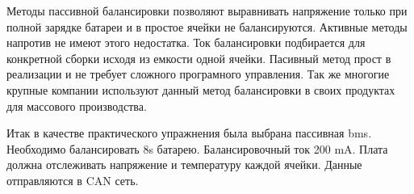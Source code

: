 Методы пассивной балансировки позволяют выравнивать напряжение только при полной зарядке батареи
и в простое ячейки не балансируются. Активные методы напротив не имеют этого недостатка.
Ток балансировки подбирается для конкретной сборки исходя из емкости одной ячейки.
Пасивный метод прост в реализации и не требует сложного програмного управления. 
Так же многогие крупные компании используют данный метод балансировки в своих продуктах для массового производства.


Итак в качестве практического упражнения была выбрана пассивная \acs{bms}.
Необходимо балансировать 8s батарею. Балансировочный ток 200 mA. 
Плата должна отслеживать напряжение и температуру каждой ячейки.
Данные отправляются в CAN сеть.
